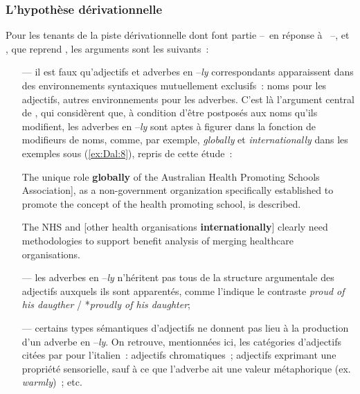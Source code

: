 \documentclass[output=paper]{langsci/langscibook}
\begin{document}
\subsubsection{L'hypothèse dérivationnelle}\label{section:dal:2.2.2}

Pour les tenants de la piste dérivationnelle dont font partie %
\citet{Zwicky1995} %
%
--~en réponse à %
\citet{SugiokaLehr1983}%
%
~--, et %
\citet{Payne10}%
%
, que reprend %
\citet{Ricca15}%
%
, les arguments sont les suivants~:

\begin{itemize}
\item[---] il est faux qu'adjectifs et adverbes en --\emph{ly} correspondants apparaissent dans des environnements syntaxiques mutuellement exclusifs~: noms pour les adjectifs, autres environnements pour les adverbes. C'est là l'argument central de %
\citet{Payne10}%
%
, qui considèrent que, à condition d'être postposés aux noms qu'ils modifient, les adverbes en --\emph{ly} sont aptes à figurer dans la fonction de modifieurs de noms, comme, par exemple, \emph{globally} et \emph{internationally} dans les exemples sous (\ref{ex:Dal:8}), repris de cette étude~:


\ea\label{ex:Dal:8}
    \ea {[}The unique role \textbf{globally} of the Australian Health Promoting Schools Association{]}, as a non-government organization specifically established to promote the concept of the health promoting school, is described.

    \ex The NHS and {[}other health organisations \textbf{internationally}{]} clearly need methodologies to support benefit analysis of merging healthcare organisations.
\z\z

\item[---] les adverbes en --\emph{ly} n'héritent pas tous de la structure argumentale des adjectifs auxquels ils sont apparentés, comme l'indique le contraste \emph{proud of his daugther} / *\emph{proudly of his daughter};

\item[---] certains types sémantiques d'adjectifs ne donnent pas lieu à la production d'un adverbe en --\emph{ly}. On retrouve, mentionnées ici, les catégories d'adjectifs citées par %
\citet{Scalise90} %
%
pour l'italien~: adjectifs chromatiques~; adjectifs exprimant une propriété sensorielle, sauf à ce que l'adverbe ait une valeur métaphorique (ex. \emph{warmly})~; etc.

\end{itemize}
\end{document}

